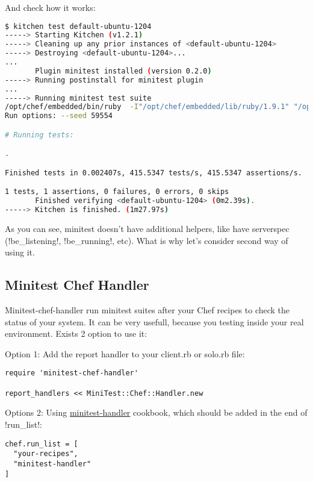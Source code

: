 And check how it works:

\begin{lstlisting}[language=Bash,label=lst:testing-minitest2]
$ kitchen test default-ubuntu-1204
-----> Starting Kitchen (v1.2.1)
-----> Cleaning up any prior instances of <default-ubuntu-1204>
-----> Destroying <default-ubuntu-1204>...
...
       Plugin minitest installed (version 0.2.0)
-----> Running postinstall for minitest plugin
...
-----> Running minitest test suite
/opt/chef/embedded/bin/ruby  -I"/opt/chef/embedded/lib/ruby/1.9.1" "/opt/chef/embedded/lib/ruby/1.9.1/rake/rake_test_loader.rb" "/tmp/busser/suites/minitest/test_default.rb"
Run options: --seed 59554

# Running tests:

.

Finished tests in 0.002407s, 415.5347 tests/s, 415.5347 assertions/s.

1 tests, 1 assertions, 0 failures, 0 errors, 0 skips
       Finished verifying <default-ubuntu-1204> (0m2.39s).
-----> Kitchen is finished. (1m27.97s)
\end{lstlisting}

As you can see, minitest doesn't have additional helpers, like have serverspec (\inline!be_listening!, \inline!be_running!, etc). What is why let's consider second way of using it.

\subsection{Minitest Chef Handler}

Minitest-chef-handler run minitest suites after your Chef recipes to check the status of your system. It can be very usefull, because you testing inside your real environment. Exists 2 option to use it:

Option 1: Add the report handler to your client.rb or solo.rb file:

\begin{lstlisting}[label=lst:testing-minitest3]
require 'minitest-chef-handler'

report_handlers << MiniTest::Chef::Handler.new
\end{lstlisting}

Options 2: Using \href{https://github.com/btm/minitest-handler-cookbook}{minitest-handler} cookbook, which should be added in the end of \inline!run_list!:

\begin{lstlisting}[label=lst:testing-minitest4]
chef.run_list = [
  "your-recipes",
  "minitest-handler"
]
\end{lstlisting}

